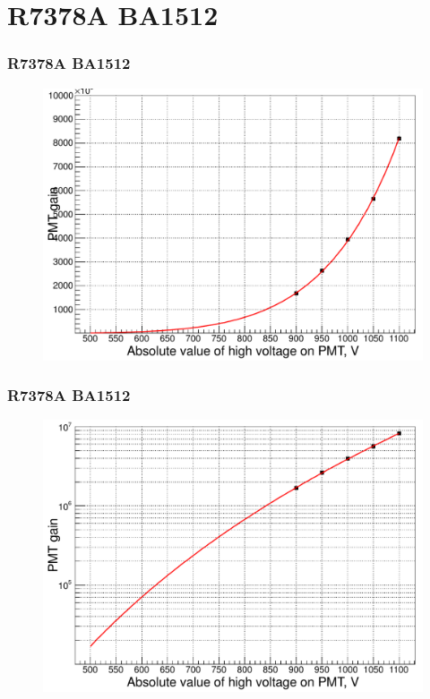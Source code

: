 \documentclass{beamer}
\begin{document}
\section{R7378A BA1512}
\begin{frame}
\frametitle{R7378A BA1512}
\begin{figure}
  \includegraphics[width=0.95\linewidth]{./pmtGainR7378A_BA1512.pdf}
\end{figure}
\end{frame}
\begin{frame}
\frametitle{R7378A BA1512}
\begin{figure}
  \includegraphics[width=0.95\linewidth]{./pmtGainR7378A_BA1512_log.pdf}
\end{figure}
\end{frame}
\end{document}

